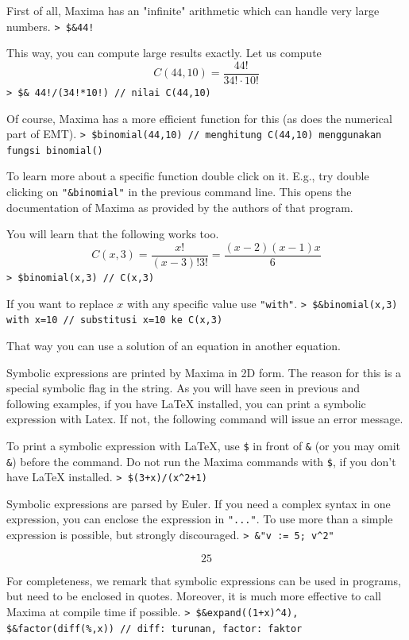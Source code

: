\documentclass[11pt, a4paper]{article}
\newcommand{\emtcmd}[1]{\noindent\texttt{\textcolor{emtcommand}{>}\ #1}\par\smallskip}
\begin{document}
First of all, Maxima has an "infinite" arithmetic which can handle very large numbers.
\emtcmd{\$\&44!}

This way, you can compute large results exactly. Let us compute
$$C(44,10) = \frac{44!}{34! \cdot 10!}$$
\emtcmd{\$\& 44!/(34!*10!) \textcolor{emtcomment}{// nilai C(44,10)}}

Of course, Maxima has a more efficient function for this (as does the numerical part of EMT).
\emtcmd{\$binomial(44,10) \textcolor{emtcomment}{// menghitung C(44,10) menggunakan fungsi binomial()}}

To learn more about a specific function double click on it. E.g., try double clicking on \texttt{"\&binomial"} in the previous command line. This opens the documentation of Maxima as provided by the authors of that program.

You will learn that the following works too.
$$C(x,3)=\frac{x!}{(x-3)!3!}=\frac{(x-2)(x-1)x}{6}$$
\emtcmd{\$binomial(x,3) \textcolor{emtcomment}{// C(x,3)}}

If you want to replace $x$ with any specific value use \texttt{"with"}.
\emtcmd{\$\&binomial(x,3) with x=10 \textcolor{emtcomment}{// substitusi x=10 ke C(x,3)}}

That way you can use a solution of an equation in another equation.

Symbolic expressions are printed by Maxima in 2D form. The reason for this is a special symbolic flag in the string. As you will have seen in previous and following examples, if you have LaTeX installed, you can print a symbolic expression with Latex. If not, the following command will issue an error message.

To print a symbolic expression with LaTeX, use \texttt{\$} in front of \texttt{\&} (or you may omit \texttt{\&}) before the command. Do not run the Maxima commands with \texttt{\$}, if you don't have LaTeX installed.
\emtcmd{\$(3+x)/(x\^{}2+1)}

Symbolic expressions are parsed by Euler. If you need a complex syntax in one expression, you can enclose the expression in \texttt{"..."}. To use more than a simple expression is possible, but strongly discouraged.
\emtcmd{\&"v := 5; v\^{}2"}
$$25$$

For completeness, we remark that symbolic expressions can be used in programs, but need to be enclosed in quotes. Moreover, it is much more effective to call Maxima at compile time if possible.
\emtcmd{\$\&expand((1+x)\^{}4), \$\&factor(diff(\%,x)) \textcolor{emtcomment}{// diff: turunan, factor: faktor}}
\end{document}
